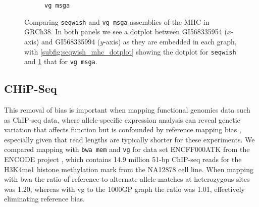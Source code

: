 \begin{figure}[htbp!]
\begin{subfigure}[t]{0.49\textwidth}
    \caption{{\tt vg msga}}
    \label{subfig:vg_msga_mhc_dotplot}
  \end{subfigure}
  \caption[Dotplots from assemblies of the MHC in GRCh38.]{
    Comparing {\tt seqwish} and {\tt vg msga} assemblies of the MHC in GRCh38.
    In both panels we see a dotplot between GI568335954 ($x$-axis) and GI568335994 ($y$-axis) as they are embedded in each graph, with \ref{subfig:seqwish_mhc_dotplot} showing the dotplot for {\tt seqwish} and \ref{subfig:vg_msga_mhc_dotplot} that for {\tt vg msga}.
  }
  \label{fig:mhc_dotplots}
\end{figure}

\subsection{CHiP-Seq}

This removal of bias is important when mapping functional genomics data such as ChIP-seq data, where allele-specific expression analysis can reveal genetic variation that affects function but is confounded
by reference mapping bias \cite{mcdaniell2010heritable}, especially given that read lengths are typically shorter for these experiments.
We compared mapping with {\tt bwa mem} and {\tt vg} for data set ENCFF000ATK from the ENCODE project \cite{encode2012integrated}, which contains 14.9 million 51-bp ChIP-seq reads for the H3K4me1 histone methylation mark from the NA12878 cell line.
When mapping with bwa the ratio of reference to alternate allele matches at heterozygous sites was 1.20, whereas with vg to the 1000GP graph the ratio was 1.01, effectively eliminating reference bias.

